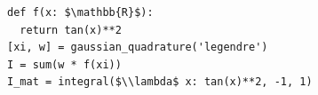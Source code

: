 \documentclass[border=10pt]{standalone}
\begin{document}
\begin{lstlisting}
def f(x: $\mathbb{R}$):
  return tan(x)**2
[xi, w] = gaussian_quadrature('legendre')
I = sum(w * f(xi))
I_mat = integral($\\lambda$ x: tan(x)**2, -1, 1)
\end{lstlisting}
\end{document}

